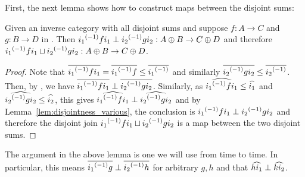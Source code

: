 First, the next lemma shows how to construct maps between the disjoint sums:
\begin{lemma}\label{lem:disjoint_sum_maps_are_perp}
  Given \X an inverse category with all disjoint sums and suppose $f:A \to C$ and $g:B\to D$ in
  \X. Then  ${i_1}^{(-1)} f i_1 \perp {i_2}^{(-1)} g i_2 : A\oplus B\to C\oplus D$ and therefore
  ${i_1}^{(-1)} f i_1 \sqcup {i_2}^{(-1)} g i_2 : A\oplus B\to C\oplus D$.
\end{lemma}
\begin{proof}
  Note that $\overline{{i_1}^{(-1)} f i_1} = \overline{{i_1}^{(-1)} f} \le \overline{{i_1}^{(-1)}}$ and similarly
  $\overline{{i_2}^{(-1)} g i_2} \le \overline{{i_2}^{(-1)}}$. Then, by , we have
  $\overline{{i_1}^{(-1)} f i_1} \perp \overline{{i_2}^{(-1)} g i_2}$.
  Similarly, as $\widehat{{i_1}^{(-1)} f i_1} \le \widehat{i_1}$ and  $\widehat{{i_2}^{(-1)} g i_2} \le \widehat{i_2}$,
  this gives $\widehat{{i_1}^{(-1)} f i_1} \perp \widehat{{i_2}^{(-1)} g i_2}$ and by
  Lemma~\ref{lem:disjointness_various}, the conclusion is ${i_1}^{(-1)} f i_1\perp {i_2}^{(-1)} g i_2$
  and therefore the disjoint join ${i_1}^{(-1)} f i_1 \sqcup {i_2}^{(-1)} g i_2$ is a map between the two
  disjoint sums.
\end{proof}

The argument in the above lemma is one we will use from time to time. In particular, this means
$\overline{{i_1}^{(-1)} g} \perp \overline{{i_2}^{(-1)} h}$ for arbitrary $g,h$ and that
$\widehat{h i_1} \perp \widehat{k i_2}$.


